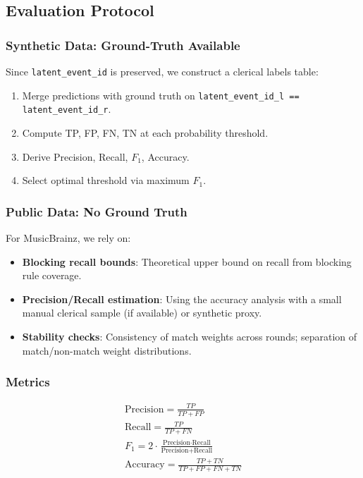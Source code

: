 \subsection{Evaluation Protocol}
\label{sec:evaluation_protocol}

\subsubsection{Synthetic Data: Ground-Truth Available}
Since \texttt{latent\_event\_id} is preserved, we construct a clerical labels table:
\begin{enumerate}
	\item Merge predictions with ground truth on \texttt{latent\_event\_id\_l == latent\_event\_id\_r}.
	\item Compute TP, FP, FN, TN at each probability threshold.
	\item Derive Precision, Recall, $F_1$, Accuracy.
	\item Select optimal threshold via maximum $F_1$.
\end{enumerate}

\subsubsection{Public Data: No Ground Truth}
For MusicBrainz, we rely on:
\begin{itemize}
	\item \textbf{Blocking recall bounds}: Theoretical upper bound on recall from blocking rule coverage.
	\item \textbf{Precision/Recall estimation}: Using the \splink{} accuracy analysis with a small manual clerical sample (if available) or synthetic proxy.
	\item \textbf{Stability checks}: Consistency of match weights across \emalgo{} rounds; separation of match/non-match weight distributions.
\end{itemize}

\subsubsection{Metrics}
\label{sec:metrics}
\begin{gather}
	\text{Precision} = \frac{TP}{TP + FP}                                                                    \\
	\text{Recall} = \frac{TP}{TP + FN}                                                                    \\
	F_1 = 2 \cdot \frac{\text{Precision} \cdot \text{Recall}}{\text{Precision} + \text{Recall}} \\
	\text{Accuracy} = \frac{TP + TN}{TP + FP + FN + TN}
\end{gather}


